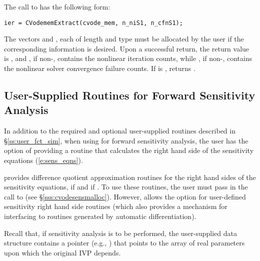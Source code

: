 The call to  has the following form:
\begin{verbatim}
ier = CVodememExtract(cvode_mem, n_niS1, n_cfnS1);
\end{verbatim}
The vectors  and , each of length  and type
 must be allocated by the user if the corresponding information
is desired. Upon a successful return, the return value is , and
, if non-, contains the nonlinear iteration counts,
while , if non-, contains the nonlinear solver convergence failure counts.
If  is ,  returns .

\subsection{User-Supplied Routines for Forward Sensitivity Analysis}\label{ss:user_fct_fwd}

In addition to the required and optional user-supplied routines described
in \S\ref{ss:user_fct_sim}, when using {\cvodes} for forward sensitivity analysis,
the user has the option of providing a routine that calculates the right hand side 
of the sensitivity equations (\ref{e:sens_eqns}).

{\cvodes} provides difference quotient approximation routines for the right
hand sides of the sensitivity equations,  if 
and  if . 
To use these routines, the user must pass  in the call to
 (see \S\ref{sss:cvodesensmalloc}). However, {\cvodes}
allows the option for user-defined sensitivity right hand side routines
(which also provides a mechanism for interfacing {\cvodes} to routines
generated by automatic differentiation).

Recall that, if sensitivity analysis is to be performed, the user-supplied 
data structure  contains a pointer (e.g., ) that points 
to the array of real parameters upon which the original IVP depends.

